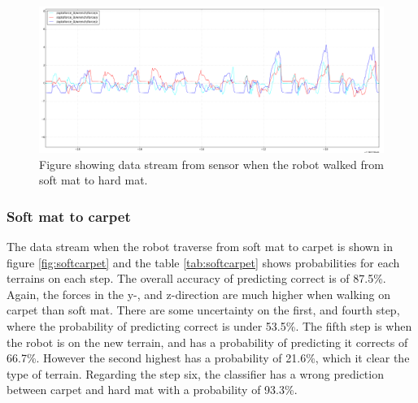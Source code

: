 \documentclass[USenglish]{ifimaster}  %
\begin{document}
	\begin{figure}[h]
		\centering
		\includegraphics[width=\textwidth,height=\textheight,keepaspectratio]{Figures/MM_4Resten_MB}
		\caption{Figure showing data stream from sensor when the robot walked from soft mat to hard mat.}
		\label{fig:MM_4_Resten_BGraf}
	\end{figure}
	
	\begin{table}[h]
		\centering
		\caption{The table showing probability of each terrain per step walking from soft mat to hard mat. Marked green represent correct prediction and correct terrain, red represent wrong prediction and yellow is the correct prediction if it got wrong.}
		\label{MM4MB}
	\end{table}
	\FloatBarrier
	\clearpage
\subsubsection{Soft mat to carpet}
The data stream when the robot traverse from soft mat to carpet is shown in figure \ref{fig:softcarpet} and the table \ref{tab:softcarpet} shows probabilities for each terrains on each step. The overall accuracy of predicting correct is of 87.5\%. Again, the forces in the y-, and z-direction are much higher when walking on carpet than soft mat. There are some uncertainty on the first, and fourth step, where the probability of predicting correct is under 53.5\%. The fifth step is when the robot is on the new terrain, and has a probability of predicting it corrects of 66.7\%. However the second highest has a probability of 21.6\%, which it clear the type of terrain. Regarding the step six, the classifier has a wrong prediction between carpet and hard mat with a probability of 93.3\%.
	
\end{document}
